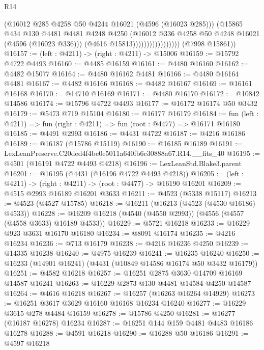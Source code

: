 \begin{lexlean}{R14}
\begin{coremodule}
                                    (@16012 @285 @4258 @50 @4244 @16021 (@4596 (@16023 @285)))
                                    (@15865
                                      @434
                                      @130
                                      @4481
                                      @4481
                                      @4248
                                      @4250
                                      (@16012 @336 @4258 @50 @4248 @16021 (@4596 (@16023 @336)))
                                      (@4616 @15813)))))))))))))))))
      (@7998 @15861))
@16157 := (left : @4211) -> (right : @4211) -> @15006
@16159 := @15792 @4722 @4493
@16160 := @4485 @16159
@16161 := @4480 @16160
@16162 := @4482 @15077
@16164 := @4480 @16162 @4481
@16166 := @4480 @16164 @4481
@16167 := @4482 @16166
@16168 := @4482 @16167
@16169 := @16161 @16168
@16170 := @14710 @16169
@16171 := @4480 @16170
@16172 := @10842 @14586
@16174 := @15796 @4722 @4493
@16177 := @16172 @16174 @50 @3432
@16179 := @5473 @719 @15104
@16180 := @16177 @16179
@16184 := fun (left : @4211) => fun (right : @4211) => fun (root : @4477) => @16171 @16180
@16185 := @4491 @2993
@16186 := @4431 @4722
@16187 := @4216 @16186
@16189 := @16187 (@15786 @15119)
@16190 := @16185 @16189
@16191 := LexLeanPreserve.C20ded4f4be0e5011a640fb6c30888a67.R14.__fits_40
@16195 := @4501 (@16191 @4722 @4493 @4218)
@16196 := LexLeanStd.Blake3.parent
@16201 := @16195 (@4431 (@16196 @4722 @4493 @4218))
@16205 := (left : @4211) -> (right : @4211) -> (root : @4477) -> @16190 @16201
@16209 := @4515 @2993 @16189 @16201 @3633
@16211 := @4523 (@5338 @15117)
@16213 := @4523 (@4527 @15785)
@16218 := @16211 (@16213 (@4523 (@4530 @16186) @4533))
@16228 := @16209 @16218 (@4540 (@4550 @2993)) (@4556 (@4557 (@4558 @3633) @16189 @4533))
@16229 := @5721 @16218
@16233 := @16229 @923 @3631 @16170 @16180
@16234 := @8091 @16174
@16235 := @4216 @16234
@16236 := @713 @16179
@16238 := @4216 @16236 @4250
@16239 := @14335 @16238
@16240 := @4975 @16239
@16241 := @16235 @16240
@16250 := @16233 (@14901 @16241) (@4431 (@10849 @14586 @16174 @50 @3432 @16179))
@16251 := @4582 @16218
@16257 := @16251 @2875 @3630 @14709 @16169 @14587 @16241
@16263 := @16229 @2873 @130 @4481 @14584 @4250 @14587
@16264 := @4616 @16218
@16267 := @16257 (@16263 @16264 @14929)
@16273 := @16251 @3617 @3629 @16160 @16168 @16234 @16240
@16277 := @16229 @3615 @278 @4484 @16159
@16278 := @15786 @4250
@16281 := @16277 (@16187 @16278) @16234
@16287 := @16251 @144 @159 @4481 @4483 @16186 @16278
@16288 := @4591 @16218
@16290 := @16288 @50 @16186
@16291 := @4597 @16218

\end{coremodule}
\end{lexlean}
